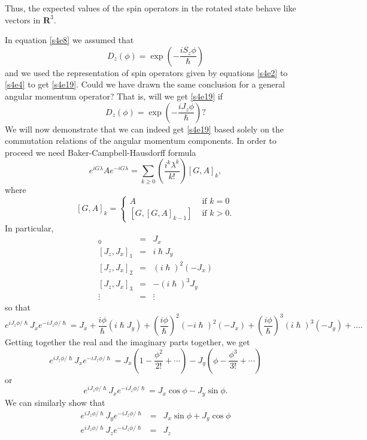 \documentclass{article}
\numberwithin{equation}{section}
\theoremstyle{plain}
\numberwithin{thm}{section}
\theoremstyle{plain}
\numberwithin{prop}{section}
\theoremstyle{definition}
\numberwithin{defn}{section}
\theoremstyle{remark}
\begin{document}
Thus, the expected values of the spin operators in the rotated state behave 
like vectors in $\mathbf{R}^3$.

In equation \eqref{s4e8} we assumed that 
\[
D_z(\phi) = \exp\left(-\frac{iS_z\phi}{\hslash}\right)
\]
and we used the representation of spin operators given by equations \eqref{s4e2}
to \eqref{s4e4} to get \eqref{s4e19}. Could we have drawn the same conclusion
for a general angular momentum operator? That is, will we get \eqref{s4e19}
if
\begin{equation}\label{s4e20}
D_z(\phi) = \exp\left(-\frac{iJ_z\phi}{\hslash}\right)?
\end{equation}
We will now demonstrate that we can indeed get \eqref{s4e19} based solely on
the commutation relations of the angular momentum components. In order to 
proceed we need Baker-Campbell-Hausdorff formula
\begin{equation}\label{s4e21}
e^{iG\lambda}Ae^{-iG\lambda} = 
\sum_{k \ge 0}\left(\frac{i^k\lambda^k}{k!}\right)[G, A]_k,
\end{equation}
where
\begin{equation}\label{s4e22}
[G, A]_k = \begin{cases}
A & \text{ if } k = 0 \\
[G, [G, A]_{k-1}] & \text{ if } k > 0.
\end{cases}
\end{equation}
In particular,
\begin{eqnarray}
[J_z, J_x]_0 &=& J_x \label{s4e23} \\
{}[J_z, J_x]_1 &=& i\hslash J_y \label{s4e24} \\
{}[J_z, J_x]_2 &=& (i\hslash)^2 (-J_x) \label{s4e25} \\
{}[J_z, J_x]_3 &=& -(i\hslash)^3 J_y \label{s4e26} \\
\vdots &=& \vdots \nonumber
\end{eqnarray}
so that
\[
e^{iJ_z\phi/\hslash}J_xe^{-iJ_z\phi/\hslash} = J_x + \frac{i\phi}{\hslash}
(i\hslash J_y) + \left(\frac{i\phi}{\hslash}\right)^2(-i\hslash)^2(-J_x)
+ \left(\frac{i\phi}{\hslash}\right)^3(i\hslash)^3(-J_y) + \ldots.
\]
Getting together the real and the imaginary parts together, we get
\[
e^{iJ_z\phi/\hslash}J_xe^{-iJ_z\phi/\hslash} = J_x\left(1 - \frac{\phi^2}{2!}
+ \cdots\right) - J_y\left(\phi - \frac{\phi^3}{3!} + \cdots\right)
\]
or
\begin{equation}\label{s4e27}
e^{iJ_z\phi/\hslash}J_xe^{-iJ_z\phi/\hslash} = J_x\cos\phi - J_y\sin\phi.
\end{equation}
We can similarly show that
\begin{eqnarray}
e^{iJ_z\phi/\hslash}J_ye^{-iJ_z\phi/\hslash} &=& J_x\sin\phi + J_y\cos\phi 
\label{s4e28} \\
e^{iJ_z\phi/\hslash}J_ze^{-iJ_z\phi/\hslash} &=& J_z \label{s4e29}
\end{eqnarray}
\end{document}
